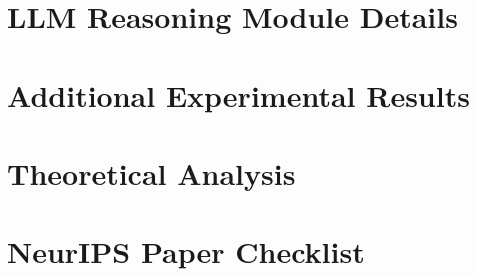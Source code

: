 \documentclass{article}
\begin{document}
\section{LLM Reasoning Module Details}
\label{app:llm}

\section{Additional Experimental Results}
\label{app:results}

\section{Theoretical Analysis}
\label{app:theory}


\newpage
\section*{NeurIPS Paper Checklist}
\end{document}
